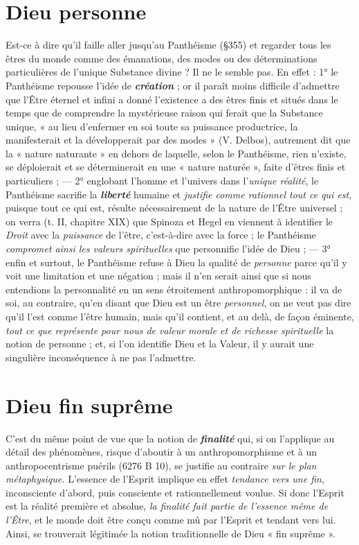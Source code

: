 \section{Dieu personne}%
Est-ce à dire qu’il faille aller jusqu’au
Panthéisme (\S 355) et regarder tous les êtres du monde comme des
émanations, des modes ou des déterminations particulières de l’unique
Substance divine ? Il ne le semble pas. En effet : 1° le Panthéisme
repousse l’idée de \textbf{\textit {création}} ; or il paraît moins difficile d'admettre que
l’Être éternel et infini a donné l’existence a des êtres finis et situés
dans le temps que de comprendre la mystérieuse raison qui ferait que
la Substance unique, « au lieu d’enfermer en soi toute sa puissance
productrice, la manifesterait et la développerait par des modes »
(V. Delbos), autrement dit que la « nature naturante » en dehors
de laquelle, selon le Panthéisme, rien n’existe, se déploierait et se
déterminerait en une « nature naturée », faite d’êtres finis et particuliers ;
— 2° englobant l’homme et l’univers dans l’{\it unique réalité},
le Panthéisme sacrifie la \textbf{\textit {liberté}} humaine et {\it justifie comme rationnel
tout ce qui est}, puisque tout ce qui est, résulte nécessairement de la
nature de l’Être universel ; on verra (t. II, chapitre XIX) que Spinoza
et Hegel en viennent à identifier le {\it Droit} avec la {\it puissance} de
l'être, c’est-à-dire avec la force ; le Panthéisme {\it compromet ainsi les
valeurs spirituelles} que personnifie l’idée de Dieu ; — 3° enfin et
surtout, le Panthéisme refuse à Dieu la qualité de {\it personne} parce qu’il
y voit une limitation et une négation ; mais il n’en serait ainsi que si
nous entendions la personnalité en un sens étroitement anthropomorphique :
il va de soi, au contraire, qu’en disant que Dieu est un
être {\it personnel}, on ne veut pas dire qu'il l’est comme l’être humain,
mais qu’il contient, et au delà, de façon éminente, {\it tout ce que représente
pour nous de valeur morale et de richesse spirituelle} la notion de
personne ; et, si l’on identifie Dieu et la Valeur, il y aurait une singulière
inconséquence à ne pas l’admettre.

\section{Dieu fin suprême}%
C’est du même point de vue que la
notion de \textbf{\textit {finalité}} qui, si on l’applique au détail des phénomènes,
risque d’aboutir à un anthropomorphisme et à un anthropocentrisme
puérils (6276 B 10), se justifie au contraire {\it sur le plan métaphysique.}
L’essence de l'Esprit implique en effet {\it tendance vers une fin}, inconsciente
d’abord, puis consciente et rationnellement voulue. Si donc
l'Esprit est la réalité première et absolue, {\it la finalité fait partie de
l'essence même de l’Être}, et le monde doit être conçu comme mû par
l'Esprit et tendant vers lui. Ainsi, se trouverait légitimée la notion
traditionnelle de Dieu « fin suprême ».

